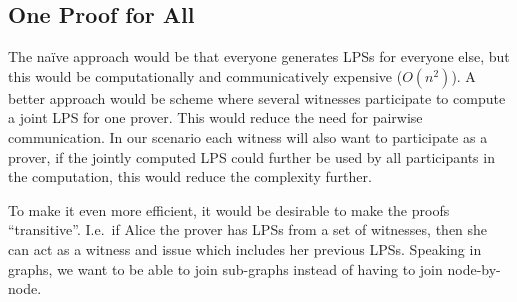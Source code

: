 \subsection{One Proof for All}

The naïve approach would be that everyone generates \acp{LPS} for everyone 
else, but this would be computationally and communicatively expensive 
(\(O(n^2)\)).
A better approach would be  scheme where several witnesses participate 
to compute a joint \ac{LPS} for one prover.
This would reduce the need for pairwise communication.
In our scenario each witness will also want to participate as a prover, if the 
jointly computed \ac{LPS} could further be used by all participants in the 
computation, this would reduce the complexity further.

To make it even more efficient, it would be desirable to make the proofs 
\enquote{transitive}.
I.e.\ if Alice the prover has \acp{LPS} from a set of witnesses, then she can 
act as a witness and issue  which includes her previous \acp{LPS}.
Speaking in graphs, we want to be able to join sub-graphs instead of having to 
join node-by-node.


